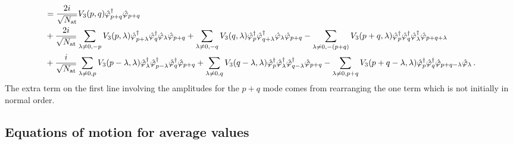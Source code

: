 \documentclass[aps,prd,notitlepage,amsfonts,amssymb,amsmath,nofootinbib,superscriptaddress,longbibliography]{revtex4-2}
\begin{document}
\begin{appendices}
\begin{align}
\begin{split}
& =  \frac{  2  i}{\sqrt{N_{\rm at}}} V_{3}(p,q) \hat{\varphi}_{p+q}^{\dagger} \hat{\varphi}_{p+q} \\
   & + \frac{2 i}{\sqrt{N_{\rm at}}} \sum_{\lambda \neq 0, -p}  V_{3}(p,\lambda) \hat{\varphi}_{p+\lambda}^{\dagger} \hat{\varphi}_{q}^{\dagger} \hat{\varphi}_{\lambda} \hat{\varphi}_{p+q} +  \sum_{\lambda \neq 0,-q}  V_{3}(q,\lambda) \hat{\varphi}_{p}^{\dagger} \hat{\varphi}_{q+\lambda}^{\dagger} \hat{\varphi}_{\lambda} \hat{\varphi}_{p+q} -  \sum_{\lambda \neq 0,-(p+q) } V_{3}(p+q,\lambda) \hat{\varphi}_{p}^{\dagger} \hat{\varphi}_{q}^{\dagger} \hat{\varphi}_{\lambda}^{\dagger} \hat{\varphi}_{p+q+\lambda} \\
   & + \frac{i}{\sqrt{N_{\rm at}}}  \sum_{\lambda \neq 0,p}   V_{3}(p-\lambda,\lambda) \hat{\varphi}_{\lambda}^{\dagger} \hat{\varphi}_{p-\lambda}^{\dagger} \hat{\varphi}_{q}^{\dagger} \hat{\varphi}_{p+q}
    + \sum_{\lambda \neq 0,q} V_{3}(q-\lambda,\lambda) \hat{\varphi}_{p}^{\dagger} \hat{\varphi}_{\lambda}^{\dagger} \hat{\varphi}_{q-\lambda}^{\dagger} \hat{\varphi}_{p+q} - \sum_{\lambda \neq 0,p+q}  V_{3}(p+q-\lambda,\lambda) \hat{\varphi}_{p}^{\dagger} \hat{\varphi}_{q}^{\dagger} \hat{\varphi}_{p+q-\lambda} \hat{\varphi}_{\lambda}  \, .
\end{split}
\end{align}
The extra term on the first line involving the amplitudes for the $p+q$ mode comes from rearranging the one term which is not initially in normal order.

\subsection{Equations of motion for average values}


\end{appendices}
\end{document}

